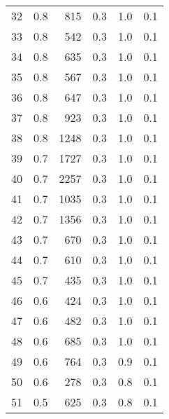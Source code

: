 \begin{tabular}{|r|r|r|r|r|r|}
32 &  0.8 & 815 & 0.3 & 1.0 & 0.1\\
33 &  0.8 & 542 & 0.3 & 1.0 & 0.1\\
34 &  0.8 & 635 & 0.3 & 1.0 & 0.1\\
35 &  0.8 & 567 & 0.3 & 1.0 & 0.1\\
36 &  0.8 & 647 & 0.3 & 1.0 & 0.1\\
37 &  0.8 & 923 & 0.3 & 1.0 & 0.1\\
38 &  0.8 & 1248 & 0.3 & 1.0 & 0.1\\
39 &  0.7 & 1727 & 0.3 & 1.0 & 0.1\\
40 &  0.7 & 2257 & 0.3 & 1.0 & 0.1\\
41 &  0.7 & 1035 & 0.3 & 1.0 & 0.1\\
42 &  0.7 & 1356 & 0.3 & 1.0 & 0.1\\
43 &  0.7 & 670 & 0.3 & 1.0 & 0.1\\
44 &  0.7 & 610 & 0.3 & 1.0 & 0.1\\
45 &  0.7 & 435 & 0.3 & 1.0 & 0.1\\
46 &  0.6 & 424 & 0.3 & 1.0 & 0.1\\
47 &  0.6 & 482 & 0.3 & 1.0 & 0.1\\
48 &  0.6 & 685 & 0.3 & 1.0 & 0.1\\
49 &  0.6 & 764 & 0.3 & 0.9 & 0.1\\
50 &  0.6 & 278 & 0.3 & 0.8 & 0.1\\
51 &  0.5 & 625 & 0.3 & 0.8 & 0.1\\
\hline
\end{tabular}
